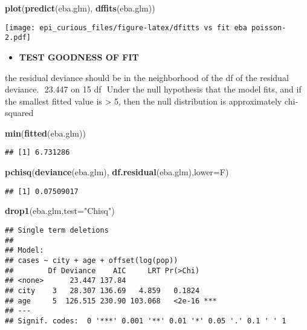 \documentclass[
]{article}
\newenvironment{Shaded}{\begin{snugshade}}{\end{snugshade}}
\newcommand{\DataTypeTok}[1]{\textcolor[rgb]{0.13,0.29,0.53}{#1}}
\newcommand{\KeywordTok}[1]{\textcolor[rgb]{0.13,0.29,0.53}{\textbf{#1}}}
\newcommand{\NormalTok}[1]{#1}
\newcommand{\StringTok}[1]{\textcolor[rgb]{0.31,0.60,0.02}{#1}}
\providecommand{\tightlist}{%
  \setlength{\itemsep}{0pt}\setlength{\parskip}{0pt}}
\begin{document}
\begin{Shaded}
\begin{Highlighting}[]
\KeywordTok{plot}\NormalTok{(}\KeywordTok{predict}\NormalTok{(eba.glm), }\KeywordTok{dffits}\NormalTok{(eba.glm))}
\end{Highlighting}
\end{Shaded}

\texttt{[image: epi\_curious\_files/figure-latex/dfitts vs fit eba poisson-2.pdf]}

\begin{itemize}
\tightlist
\item
  \textbf{TEST GOODNESS OF FIT}
\end{itemize}

the residual deviance should be in the neighborhood of the df of the
residual deviance. ︎ 23.447 on 15 df ︎ Under the null hypothesis that
the model fits, and if the smallest fitted value is \textgreater{} 5,
then the null distribution is approximately chi‐squared

\begin{Shaded}
\begin{Highlighting}[]
\KeywordTok{min}\NormalTok{(}\KeywordTok{fitted}\NormalTok{(eba.glm))}
\end{Highlighting}
\end{Shaded}

\begin{verbatim}
## [1] 6.731286
\end{verbatim}

\begin{Shaded}
\begin{Highlighting}[]
\KeywordTok{pchisq}\NormalTok{(}\KeywordTok{deviance}\NormalTok{(eba.glm),}
\KeywordTok{df.residual}\NormalTok{(eba.glm),}\DataTypeTok{lower=}\NormalTok{F) }
\end{Highlighting}
\end{Shaded}

\begin{verbatim}
## [1] 0.07509017
\end{verbatim}

\begin{Shaded}
\begin{Highlighting}[]
\KeywordTok{drop1}\NormalTok{(eba.glm,}\DataTypeTok{test=}\StringTok{"Chisq"}\NormalTok{)}
\end{Highlighting}
\end{Shaded}

\begin{verbatim}
## Single term deletions
## 
## Model:
## cases ~ city + age + offset(log(pop))
##        Df Deviance    AIC     LRT Pr(>Chi)    
## <none>      23.447 137.84                     
## city    3   28.307 136.69   4.859   0.1824    
## age     5  126.515 230.90 103.068   <2e-16 ***
## ---
## Signif. codes:  0 '***' 0.001 '**' 0.01 '*' 0.05 '.' 0.1 ' ' 1
\end{verbatim}
\end{document}
